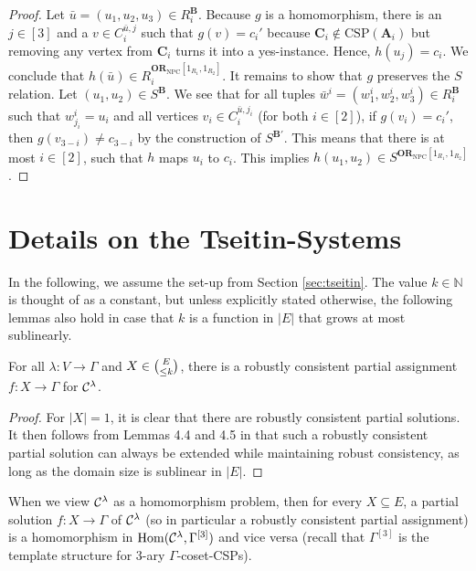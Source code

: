 \documentclass[a4paper,english, thm-restate]{lipics-v2021}
\newcommand{\tup}[1]{\bar{#1}}
\newcommand{\StructA}{\mathbf{A}}
\newcommand{\StructB}{\mathbf{B}}
\newcommand{\StructC}{\mathbf{C}}
\newcommand{\CSP}[1]{\mathrm{CSP}(#1)}
\newcommand{\Hom}[2]{\mathrm{Hom}(#1,#2)}
\newcommand{\bbN}{\mathbb{N}}
\newcommand{\CosetGrpTmplt}[2]{#1^{[#2]}}
\newcommand{\ORNPC}[1]{\mathbf{OR}_\text{NPC}[#1]}
\begin{document}
\begin{proof}
		Let $\tup{u}=(u_1,u_2,u_3) \in R_i^{\StructB}$.
		Because $g$ is a homomorphism, there is an $j \in [3]$ and a $v \in C_i^{\tup{u}, j}$ such that $g(v) = c_i'$ because
		$\StructC_i\notin \CSP{\StructA_i}$ but removing any vertex from $\StructC_i$ turns it into a yes-instance.
		Hence, $h(u_j) = c_i$.
		We conclude that $h(\tup{u}) \in R_i^{\ORNPC{1_{R_1}, 1_{R_2}}}$.
		It remains to show that $g$ preserves the $S$ relation.
		Let $(u_1,u_2) \in S^\StructB$.
		We see that for all tuples $\tup{w}^i = (w^i_1,w^i_2,w^i_3) \in R_i^{\StructB}$ 
		such that $w^i_{j_i} = u_i$ and all vertices
		$v_i \in C_{i}^{\tup{u},j_i}$ (for both $i \in[2]$),
		if $g(v_i) =  c_i'$,
		then $g(v_{3-i}) \neq c_{3-i}$ by the construction of $S^{\StructB'}$.
		This means that there is at most $i \in [2]$, such that $h$ maps $u_i$ to $c_i$. This implies $h(u_1,u_2) \in S^{\ORNPC{1_{R_1}, 1_{R_2}}}$.
	\end{proof}
	
	
	\section{Details on the Tseitin-Systems}
	\label{app:tseitin}
	
	In the following, we assume the set-up from Section \ref{sec:tseitin}. The value $k \in \bbN$ is thought of as a constant, but
	unless explicitly stated otherwise, the following lemmas also hold in case that $k$ is a function in $|E|$ that grows at most sublinearly. 
	\begin{lemma}
		\label{lem:robustly-consistent-for-all-small-contexts}
		For all $\lambda \colon V\to \Gamma$ and $X \in \tbinom{E}{\leq k}$,
		there is a robustly consistent partial assignment $f \colon X \to \Gamma$ for $\grpCSPf{H}{\Gamma}{\lambda}$. 
	\end{lemma}
	\begin{proof}
		For $|X| = 1$, it is clear that there are robustly consistent partial solutions. 
		It then follows from Lemmas 4.4 and 4.5 in \cite{BerkholzGrohe2017} that such a robustly consistent partial solution can always be extended while maintaining robust consistency, as long as the domain size is sublinear in $|E|$. 
	\end{proof}	
	


	\noindent When we view $\grpCSPf{H}{\Gamma}{\lambda}$ as a homomorphism problem,
	then for every $X \subseteq E$,
	a partial solution $f \colon X \to \Gamma$ of $\grpCSPf{H}{\Gamma}{\lambda}$ (so in particular a robustly consistent partial assignment)
	is a homomorphism in $\Hom{\grpCSPf{H}{\Gamma}{\lambda}}{\CosetGrpTmplt{\Gamma}{3}}$
	and vice versa
	(recall that $\CosetGrpTmplt{\Gamma}{3}$ is the template structure for $3$-ary $\Gamma$-coset-CSPs).
	
\end{document}
